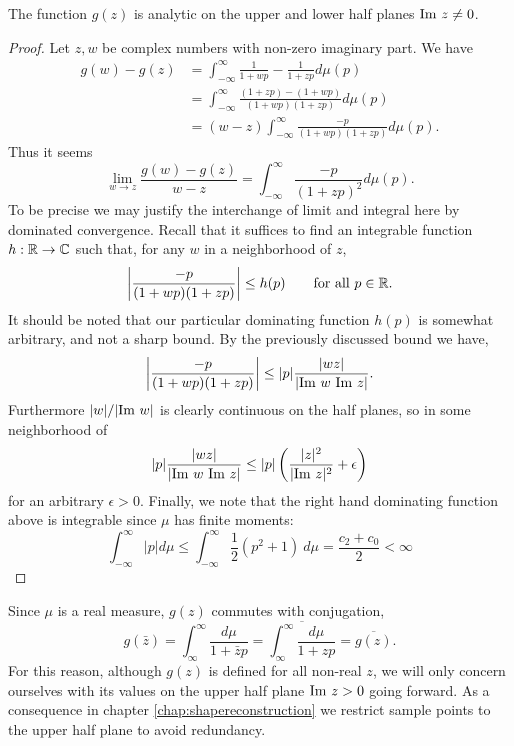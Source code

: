 \begin{proposition}
  The function $g(z)$ is analytic on the upper and lower half planes $\text{Im}~ z \neq 0$.
\end{proposition}

\begin{proof}
  Let $z, w$ be complex numbers with non-zero imaginary part. We have
  \begin{align*}
    g(w) - g(z)
    &= \int_{-\infty}^\infty \frac{1}{1 + wp} - \frac1{1 + zp}d\mu(p) \\
    &= \int_{-\infty}^\infty \frac{(1 + zp) - (1 + wp)}{(1 + wp)(1 + zp)}d\mu(p) \\
    &= (w - z) \int_{-\infty}^\infty \frac{-p}{(1 + wp)(1 + zp)}d\mu(p).
  \end{align*}
  Thus it seems
  \[
    \lim_{w \rightarrow z} \frac{g(w) - g(z)}{w - z} = \int_{-\infty}^\infty \frac{-p}{{(1+zp)}^2}d\mu(p).
  \]
  To be precise we may justify the interchange of limit and integral here by dominated convergence. Recall that it suffices to find an integrable function $h : \mathbb{R} \to \mathbb{C}$ such that, for any $w$ in a neighborhood of $z$,
  \[
    \left|\frac{-p}{(1 + wp)(1 + zp)}\right| \leq h(p) \qquad \hbox{for all $p \in \mathbb{R}$}.
  \]
  It should be noted that our particular dominating function $h(p)$ is somewhat arbitrary, and not a sharp bound. By the previously discussed bound we have,
  \[
    \left|\frac{-p}{(1 + wp)(1 + zp)}\right| \leq |p|\frac{|wz|}{|\text{Im}~ w ~\text{Im}~ z|}.
  \]
  Furthermore $|w|/|\text{Im}~ w|$ is clearly continuous on the half planes, so in some neighborhood of 
  \[
    |p|\frac{|wz|}{|\text{Im}~ w ~\text{Im}~ z|} \leq |p|\left(\frac{|z|^2}{|\text{Im}~ z|^2} + \epsilon\right)
  \]
  for an arbitrary $\epsilon > 0$. Finally, we note that the right hand dominating function above is integrable since $\mu$ has finite moments: 
  \[
    \int_{-\infty}^\infty |p| d\mu \leq \int_{-\infty}^\infty \frac12(p^2 + 1) ~d\mu = \frac{c_2 + c_0}2 < \infty
  \]
\end{proof}

\begin{remark}
  Since $\mu$ is a real measure, $g(z)$ commutes with conjugation,
  \[
    g(\bar z) = \int_\infty^\infty\frac{d\mu}{1+\bar zp} = \overline{\int_\infty^\infty\frac{d\mu}{1+zp}} = \overline{g(z)}.
  \]
  For this reason, although $g(z)$ is defined for all non-real $z$, we will only concern ourselves with its values on the upper half plane $\text{Im}~ z > 0$ going forward. As a consequence in chapter \ref{chap:shapereconstruction} we restrict sample points to the upper half plane to avoid redundancy.
\end{remark}



